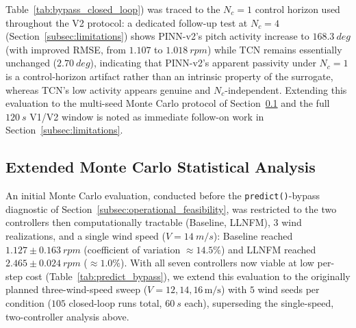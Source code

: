 Table~\ref{tab:bypass_closed_loop})  was traced to the $N_c=1$
control horizon used throughout the V2 protocol: a dedicated follow-up
test at $N_c=4$ (Section~\ref{subsec:limitations}) shows PINN-v2's
pitch activity increase to $\SI{168.3}{deg}$ (with improved RMSE, from
$1.107$ to $\SI{1.018}{rpm}$) while TCN remains essentially unchanged
($\SI{2.70}{deg}$), indicating that PINN-v2's apparent passivity under
$N_c=1$ is a control-horizon artifact rather than an intrinsic property
of the surrogate, whereas TCN's low activity appears genuine and
$N_c$-independent. Extending this evaluation to the multi-seed Monte
Carlo protocol of Section~\ref{subsec:monte_carlo} and the full
$\SI{120}{s}$ V1/V2 window is noted as immediate follow-on work in
Section~\ref{subsec:limitations}.

\subsection{Extended Monte Carlo Statistical Analysis}
\label{subsec:monte_carlo}

An initial Monte Carlo evaluation, conducted before the
\texttt{predict()}-bypass diagnostic of
Section~\ref{subsec:operational_feasibility}, was restricted to the two
controllers then computationally tractable (Baseline, LLNFM), $3$ wind
realizations, and a single wind speed ($V=\SI{14}{m/s}$): Baseline
reached $1.127\pm\SI{0.163}{rpm}$ (coefficient of variation
$\approx14.5\%$) and LLNFM reached $2.465\pm\SI{0.024}{rpm}$
($\approx1.0\%$). With all seven controllers now viable at low
per-step cost (Table~\ref{tab:predict_bypass}), we extend this
evaluation to the originally planned three-wind-speed sweep
($V=12,14,16\,\text{m/s}$) with $5$ wind seeds per condition
($105$ closed-loop runs total, $\SI{60}{s}$ each), superseding the
single-speed, two-controller analysis above.


